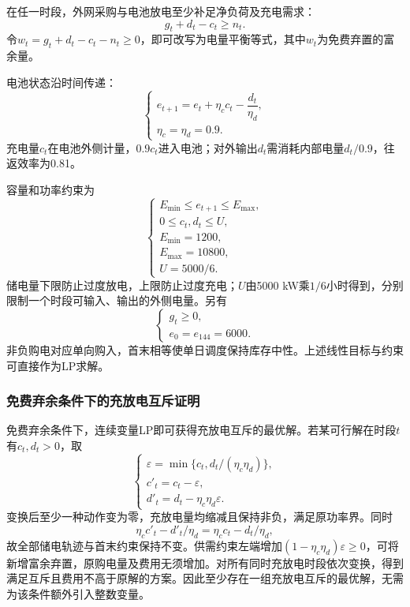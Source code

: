 在任一时段，外网采购与电池放电至少补足净负荷及充电需求：
\begin{equation}
 g_t+d_t-c_t\ge n_t.
 \label{eq:balance}
\end{equation}
令$w_t=g_t+d_t-c_t-n_t\ge0$，即可改写为电量平衡等式，其中$w_t$为免费弃置的富余量。

电池状态沿时间传递：
\begin{equation}
 \begin{cases}
 e_{t+1}=e_t+\eta_cc_t-\dfrac{d_t}{\eta_d},\\
 \eta_c=\eta_d=0.9.
 \end{cases}
 \label{eq:soc}
\end{equation}
充电量$c_t$在电池外侧计量，$0.9c_t$进入电池；对外输出$d_t$需消耗内部电量$d_t/0.9$，往返效率为0.81。

容量和功率约束为
\begin{equation}
 \begin{cases}
 E_{\min}\le e_{t+1}\le E_{\max},\\
 0\le c_t,d_t\le U,\\
 E_{\min}=1200,\\
 E_{\max}=10800,\\
 U=5000/6.
 \end{cases}
 \label{eq:limits}
\end{equation}
储电量下限防止过度放电，上限防止过度充电；$U$由5000 kW乘$1/6$小时得到，分别限制一个时段可输入、输出的外侧电量。另有
\begin{equation}
 \begin{cases}
 g_t\ge0,\\
 e_0=e_{144}=6000.
 \end{cases}
 \label{eq:terminal_q1}
\end{equation}
非负购电对应单向购入，首末相等使单日调度保持库存中性。上述线性目标与约束可直接作为LP求解。

\subsubsection{免费弃余条件下的充放电互斥证明}

免费弃余条件下，连续变量LP即可获得充放电互斥的最优解。若某可行解在时段$t$有$c_t,d_t>0$，取
\begin{equation}
 \begin{cases}
 \varepsilon=\min\{c_t,d_t/(\eta_c\eta_d)\},\\
 c'_t=c_t-\varepsilon,\\
 d'_t=d_t-\eta_c\eta_d\varepsilon.
 \end{cases}
 \label{eq:q1_remove_simultaneous}
\end{equation}
变换后至少一种动作变为零，充放电量均缩减且保持非负，满足原功率界。同时
\[
 \eta_cc'_t-d'_t/\eta_d=\eta_cc_t-d_t/\eta_d,
\]
故全部储电轨迹与首末约束保持不变。供需约束左端增加$(1-\eta_c\eta_d)\varepsilon\ge0$，可将新增富余弃置，原购电量及费用无须增加。对所有同时充放电时段依次变换，得到满足互斥且费用不高于原解的方案。因此至少存在一组充放电互斥的最优解，无需为该条件额外引入整数变量。

